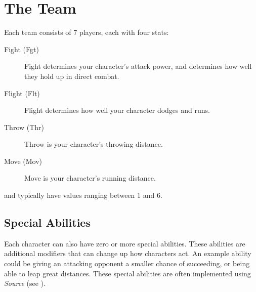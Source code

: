 \section{The Team} \label{the-team}
Each team consists of 7 players, each with four stats:

\begin{description}
    \item[Fight (Fgt)] Fight determines your character's attack power, and determines how well they hold up in direct combat.
    \item[Flight (Flt)] Flight determines how well your character dodges and runs.
    \item[Throw (Thr)] Throw is your character's throwing distance.
    \item[Move (Mov)] Move is your character's running distance.
\end{description}

\fight{} and \flight{} typically have values ranging between 1 and 6.

\subsection{Special Abilities}
Each character can also have zero or more special abilities.
These abilities are additional modifiers that can change up how characters act.
An example ability could be giving an attacking opponent a smaller chance of succeeding, or being able to leap great distances.
These special abilities are often implemented using \textit{Source} (see ).
